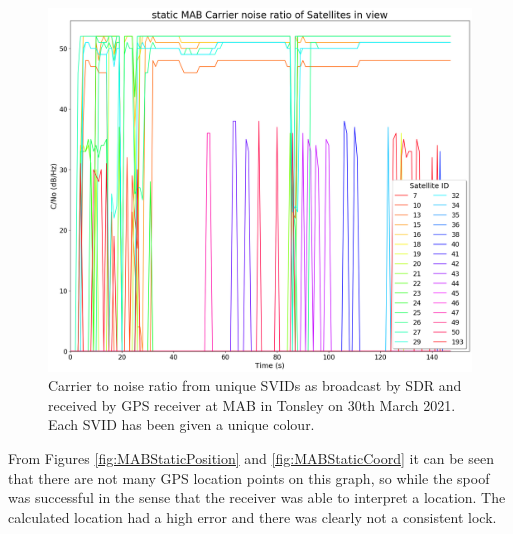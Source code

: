 \begin{figure}[H]
    \begin{centering}
        \includegraphics[width=14cm,keepaspectratio]{Figures/2021_3_30_static_MAB Carrier noise ratio.png}
        \caption{Carrier to noise ratio from unique SVIDs as broadcast by SDR and received by GPS receiver at MAB in Tonsley on 30th March 2021. Each SVID has been given a unique colour.}
        \label{fig:MABStaticCNo}
    \end{centering}
\end{figure}

From Figures \ref{fig:MABStaticPosition} and \ref{fig:MABStaticCoord} it can be seen that there are not many GPS location points on this graph, so while the spoof was
successful in the sense that the receiver was able to interpret a location. The calculated location had a high error and there was clearly not a consistent lock. 

